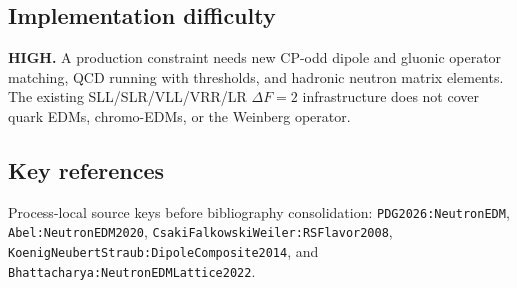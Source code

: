 \subsection*{Implementation difficulty}
\textbf{HIGH.}  A production constraint needs new CP-odd dipole and gluonic
operator matching, QCD running with thresholds, and hadronic neutron matrix
elements.  The existing SLL/SLR/VLL/VRR/LR \(\Delta F=2\) infrastructure does
not cover quark EDMs, chromo-EDMs, or the Weinberg operator.

\subsection*{Key references}
Process-local source keys before bibliography consolidation:
\texttt{PDG2026:NeutronEDM}, \texttt{Abel:NeutronEDM2020},
\texttt{CsakiFalkowskiWeiler:RSFlavor2008},
\texttt{KoenigNeubertStraub:DipoleComposite2014}, and
\texttt{Bhattacharya:NeutronEDMLattice2022}.
